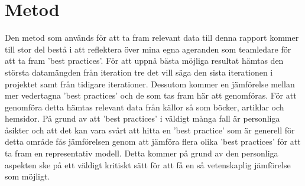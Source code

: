 \section{Metod}
Den metod som används för att ta fram relevant data till denna rapport kommer till stor del bestå i att reflektera över mina egna ageranden som teamledare för att ta fram 'best practices'. För att uppnå bästa möjliga resultat hämtas den största datamängden från iteration tre det vill säga den sista iterationen i projektet samt från tidigare iterationer. Dessutom kommer en jämförelse mellan mer vedertagna 'best practices' och de som tas fram här att genomföras. 
\newline \newline 
För att genomföra detta hämtas relevant data från källor så som böcker, artiklar och hemsidor. På grund av att 'best practices' i väldigt många fall är personliga åsikter och att det kan vara svårt att hitta en 'best practice' som är generell för detta område fås jämförelsen genom att jämföra flera olika 'best practices' för att ta fram en representativ modell. Detta kommer på grund av den personliga aspekten ske på ett väldigt kritiskt sätt för att få en så vetenskaplig jämförelse som möjligt.